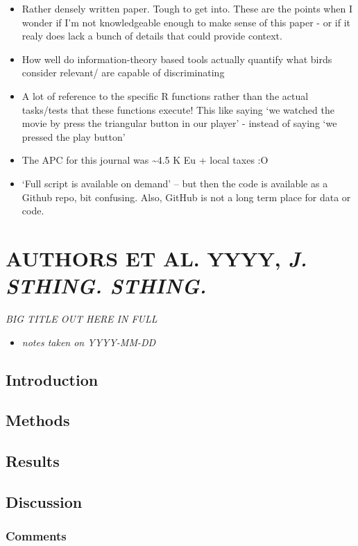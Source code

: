 \documentclass[
]{book}
\providecommand{\tightlist}{%
  \setlength{\itemsep}{0pt}\setlength{\parskip}{0pt}}
\begin{document}
\begin{itemize}
\tightlist
\item
  Rather densely written paper. Tough to get into. These are the points when I wonder if I'm not knowledgeable enough to make sense of this paper - or if it realy does lack a bunch of details that could provide context.
\item
  How well do information-theory based tools actually quantify what birds consider relevant/ are capable of discriminating
\item
  A lot of reference to the specific R functions rather than the actual tasks/tests that these functions execute! This like saying `we watched the movie by press the triangular button in our player' - instead of saying `we pressed the play button'
\item
  The APC for this journal was \textasciitilde4.5 K Eu + local taxes :O
\item
  `Full script is available on demand' -- but then the code is available as a Github repo, bit confusing. Also, GitHub is not a long term place for data or code.
\end{itemize}

\hypertarget{authors-et-al.-yyyy-j.-sthing.-sthing.}{%
\chapter{\texorpdfstring{AUTHORS ET AL. YYYY, \emph{J. STHING. STHING.}}{AUTHORS ET AL. YYYY, J. STHING. STHING.}}\label{authors-et-al.-yyyy-j.-sthing.-sthing.}}


\emph{BIG TITLE OUT HERE IN FULL} \citep{schuchmannsiemers2010a}

\begin{itemize}
\tightlist
\item
  \emph{notes taken on YYYY-MM-DD}
\end{itemize}

\hypertarget{introduction-18}{%
\section{Introduction}\label{introduction-18}}

\hypertarget{methods-17}{%
\section{Methods}\label{methods-17}}

\hypertarget{results-17}{%
\section{Results}\label{results-17}}

\hypertarget{discussion-12}{%
\section{Discussion}\label{discussion-12}}

\hypertarget{comments-16}{%
\subsection{Comments}\label{comments-16}}

  
\end{document}
